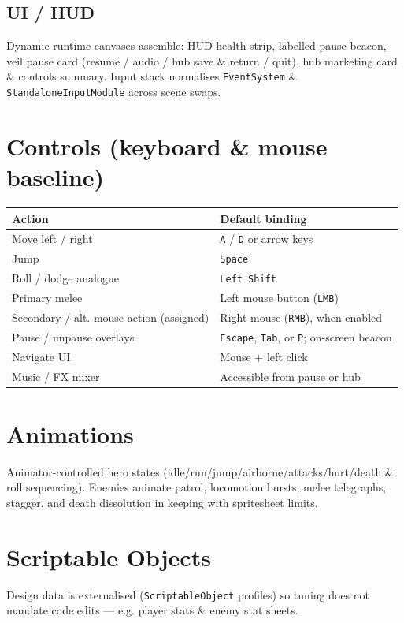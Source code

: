 \documentclass[11pt,a4paper]{article}
\begin{document}
\subsection{UI / HUD}
Dynamic runtime canvases assemble: HUD health strip, labelled pause beacon, veil pause card (resume / audio / hub save \& return / quit), hub marketing card \& controls summary. Input stack normalises \texttt{EventSystem} \& \texttt{StandaloneInputModule} across scene swaps.

\section{Controls (keyboard \& mouse baseline)}

\begin{center}
\begin{tabular}{@{}ll@{}}
\toprule
\textbf{Action} & \textbf{Default binding} \\
\midrule
Move left / right & \texttt{A} / \texttt{D} or arrow keys \\
Jump & \texttt{Space} \\
Roll / dodge analogue & \texttt{Left Shift} \\
Primary melee & Left mouse button (\texttt{LMB}) \\
Secondary / alt. mouse action (assigned) & Right mouse (\texttt{RMB}), when enabled \\
Pause / unpause overlays & \texttt{Escape}, \texttt{Tab}, or \texttt{P}; on-screen beacon \\
Navigate UI & Mouse + left click \\
Music / FX mixer & Accessible from pause or hub \\
\bottomrule
\end{tabular}
\end{center}

\section{Animations}
Animator-controlled hero states (idle/run/jump/airborne/attacks/hurt/death \& roll sequencing). Enemies animate patrol, locomotion bursts, melee telegraphs, stagger, and death dissolution in keeping with spritesheet limits.

\section{Scriptable Objects}
Design data is externalised (\texttt{ScriptableObject} profiles) so tuning does not mandate code edits --- e.g. player stats \& enemy stat sheets.
\end{document}
